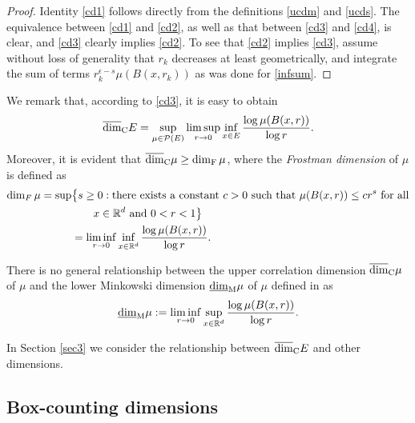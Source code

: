 \documentclass[12pt]{article}
\newcommand{\1}{{\bf 1}}
\newcommand\ucod{\overline{\mbox{\rm dim}}_{\rm C}} %
\newcommand{\R}{\mathbb{R}}
\begin{document}
\begin{proof}
Identity \eqref{cd1} follows directly from the definitions \eqref{ucdm} and \eqref{ucds}. The equivalence between \eqref{cd1} and \eqref{cd2}, as well as that between \eqref{cd3} and \eqref{cd4}, is clear, and \eqref{cd3} clearly implies \eqref{cd2}. To see that \eqref{cd2} implies \eqref{cd3}, assume without loss of generality that  $r_k$ decreases at least geometrically, 
and integrate the sum of terms $r_k^{\epsilon - s }\mu(B(x,r_k))$ as was done for \eqref{infsum}.
 \end{proof}


We remark that, according to \eqref{cd3}, it is easy to obtain 
\begin{equation*}
	\displaystyle{\ucod } E=\sup_{\mu\in {\mathcal P}(E) }\limsup_{r\rightarrow0}\inf_{x\in E}\frac{\log\mu(B(x,r))}{\log r}.
\end{equation*}
Moreover, it is evident that $\ucod\mu\geq\dim_{\rm F}\mu$, where the {\it Frostman dimension} of $\mu$ is defined as 
\begin{align}
	\dim_F \mu= \sup &\big\{s  \geq 0: \text{{\rm   there exists a   constant $c>0$  such that }} \mu(B(x,r))\leq cr^{s } \text{\rm \  for all}\notag\\
&\qquad \text{{\rm  $x \in \mathbb{R}^d$ and $0<r<1$\big\}}}\notag\\
&=\liminf_{r\to 0} \inf_{x\in {\R^d}} \frac{\log  \mu(B(x,r))}{ \log r}.
\end{align}



There is no general relationship between the upper correlation dimension  $\displaystyle{\ucod }\mu $ of $\mu$ and the lower Minkowski dimension $\underline{\dim}_{\rm M}\mu$ of $\mu$ defined in \cite{FFK} as
\begin{equation*}
	\underline{\dim}_{\rm M}\mu:=\liminf_{r\to 0} \sup_{x\in {\R^d}}\frac{\log  \mu(B(x,r))}{ \log r}.
\end{equation*}


In Section \ref{sec3} we consider the relationship between $\ucod E$ and other dimensions.

\subsection{Box-counting dimensions}
\end{document}
